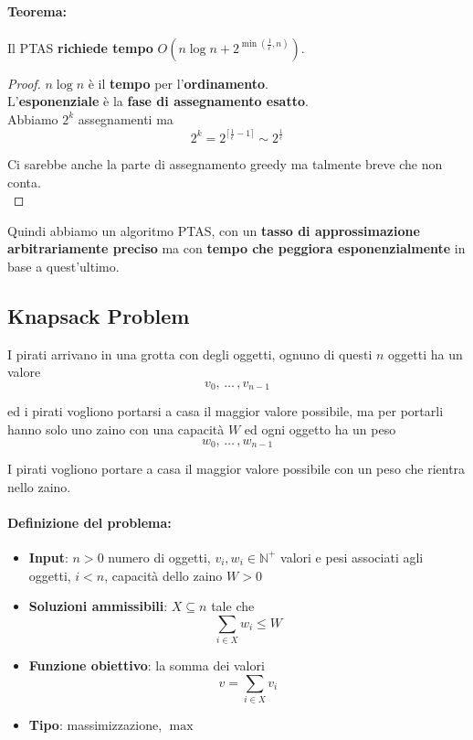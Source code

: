 \documentclass[11pt]{article}
\begin{document}
	\paragraph{Teorema:} Il PTAS \textbf{richiede tempo} $O\left(n \log n + 2^{\min \left(\frac{1}{\epsilon}, n\right)}\right)$.\\
	
	\begin{proof}
		$n \log n$ è il \textbf{tempo} per l'\textbf{ordinamento}.\\
		
		L'\textbf{esponenziale} è la \textbf{fase di assegnamento esatto}.\\
		
		Abbiamo $2^k$ assegnamenti ma 
		$$ 2^k = 2^{\lceil \frac{1}{\epsilon} - 1\rceil} \sim 2^{\frac{1}{\epsilon}}$$
		
		Ci sarebbe anche la parte di assegnamento greedy ma talmente breve che non conta.\\
	\end{proof}
	
	Quindi abbiamo un algoritmo PTAS, con un \textbf{tasso di approssimazione arbitrariamente preciso} ma con \textbf{tempo che peggiora esponenzialmente} in base a quest'ultimo.\\
	
	\newpage
	
	\subsection{Knapsack Problem}
	
	I pirati arrivano in una grotta con degli oggetti, ognuno di questi $n$ oggetti ha un valore 
	$$ v_0, \, \dots \, , v_{n-1} $$
	
	ed i pirati vogliono portarsi a casa il maggior valore possibile, ma per portarli hanno solo uno zaino con una capacità $W$ ed ogni oggetto ha un peso  
	$$ w_0, \, \dots \, , w_{n-1} $$
	
	I pirati vogliono portare a casa il maggior valore possibile con un peso che rientra nello zaino.\\
	
	
	\paragraph{Definizione del problema: }
	\begin{itemize}
		\item \textbf{Input}: $n>0$ numero di oggetti, $v_i, w_i \in \mathbb{N}^+$ valori e pesi associati agli oggetti, $i <n$, capacità dello zaino $W>0$
		\item \textbf{Soluzioni ammissibili}: $X \subseteq n$ tale che 
		$$ \sum_{i \in X} w_i \leq W $$
		\item \textbf{Funzione obiettivo}: la somma dei valori 
		$$v = \sum_{i \in X} v_i$$
		\item \textbf{Tipo}: massimizzazione, $\max$
	\end{itemize}
	
\end{document}
